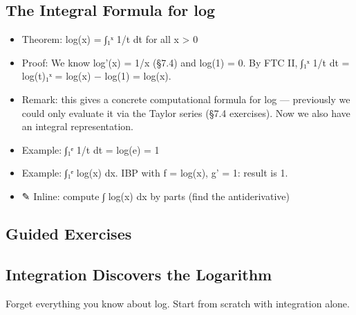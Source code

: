 \documentclass[
  10pt,
  letterpaper,
]{scrbook}
\providecommand{\tightlist}{%
  \setlength{\itemsep}{0pt}\setlength{\parskip}{0pt}}
\begin{document}
\subsection{The Integral Formula for
log}\label{the-integral-formula-for-log}

\begin{itemize}
\tightlist
\item
  Theorem: log(x) = ∫₁ˣ 1/t dt for all x \textgreater{} 0
\item
  Proof: We know log'(x) = 1/x (§7.4) and log(1) = 0. By FTC II, ∫₁ˣ 1/t
  dt = log(t)\textbar₁ˣ = log(x) − log(1) = log(x).
\item
  Remark: this gives a concrete computational formula for log ---
  previously we could only evaluate it via the Taylor series (§7.4
  exercises). Now we also have an integral representation.
\item
  Example: ∫₁ᵉ 1/t dt = log(e) = 1
\item
  Example: ∫₁ᵉ log(x) dx. IBP with f = log(x), g' = 1: result is 1.
\item
  ✎ Inline: compute ∫ log(x) dx by parts (find the antiderivative)
\end{itemize}

\subsection{Guided Exercises}\label{guided-exercises-20}

\subsection{Integration Discovers the
Logarithm}\label{integration-discovers-the-logarithm}

Forget everything you know about log. Start from scratch with
integration alone.
\end{document}
